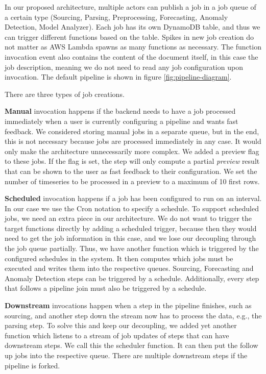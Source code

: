 In our proposed architecture, multiple actors can publish a job in a job queue of a certain type (Sourcing, Parsing, Preprocessing, Forecasting, Anomaly Detection, Model Analyzer). Each job has its own DynamoDB table, and thus we can trigger different functions based on the table. Spikes in new job creation do not matter as AWS Lambda spawns as many functions as necessary. The function invocation event also contains the content of the document itself, in this case the job description, meaning we do not need to read any job configuration upon invocation. 
The default pipeline is shown in figure \ref{fig:pipeline-diagram}.

There are three types of job creations. 

\textbf{Manual} invocation happens if the backend needs to have a job processed immediately when a user is currently configuring a pipeline and wants fast feedback. We considered storing manual jobs in a separate queue, but in the end, this is not necessary because jobs are processed immediately in any case. It would only make the architecture unnecessarily more complex. We added a preview flag to these jobs. If the flag is set, the step will only compute a partial \emph{preview} result that can be shown to the user as fast feedback to their configuration. We set the number of timeseries to be processed in a preview to a maximum of 10 first rows.

\textbf{Scheduled} invocation happens if a job has been configured to run on an interval. In our case we use the Cron \cite{cron} notation to specify a schedule. To support scheduled jobs, we need an extra piece in our architecture. We do not want to trigger the target functions directly by adding a scheduled trigger, because then they would need to get the job information in this case, and we lose our decoupling through the job queue partially. Thus, we have another function which is triggered by the configured schedules in the system. It then computes which jobs must be executed and writes them into the respective queues. Sourcing, Forecasting and Anomaly Detection steps can be triggered by a schedule. Additionally, every step that follows a pipeline join must also be triggered by a schedule.

\newpage
\textbf{Downstream} invocations happen when a step in the pipeline finishes, such as sourcing, and another step down the stream now has to process the data, e.g., the parsing step. To solve this and keep our decoupling, we added yet another function which listens to a stream of job updates of steps that can have downstream steps. We call this the scheduler function. It can then put the follow up jobs into the respective queue. There are multiple downstream steps if the pipeline is forked.

